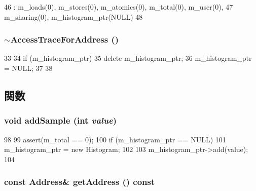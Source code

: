 \begin{DoxyCode}
46         : m_loads(0), m_stores(0), m_atomics(0), m_total(0), m_user(0),
47           m_sharing(0), m_histogram_ptr(NULL)
48     { }
\end{DoxyCode}
\hypertarget{classAccessTraceForAddress_aaa716e2119d8eda1e7428c63cedd2d75}{
\subsubsection[{$\sim$AccessTraceForAddress}]{\setlength{\rightskip}{0pt plus 5cm}$\sim${\bf AccessTraceForAddress} ()}}
\label{classAccessTraceForAddress_aaa716e2119d8eda1e7428c63cedd2d75}



\begin{DoxyCode}
33 {
34     if (m_histogram_ptr) {
35         delete m_histogram_ptr;
36         m_histogram_ptr = NULL;
37     }
38 }
\end{DoxyCode}


\subsection{関数}
\hypertarget{classAccessTraceForAddress_ae8690c0646a12dd970f77127705f1449}{
\subsubsection[{addSample}]{\setlength{\rightskip}{0pt plus 5cm}void addSample (int {\em value})}}
\label{classAccessTraceForAddress_ae8690c0646a12dd970f77127705f1449}



\begin{DoxyCode}
98 {
99     assert(m_total == 0);
100     if (m_histogram_ptr == NULL) {
101         m_histogram_ptr = new Histogram;
102     }
103     m_histogram_ptr->add(value);
104 }
\end{DoxyCode}
\hypertarget{classAccessTraceForAddress_aca15ef966561def0b4db75a6f7e085b6}{
\subsubsection[{getAddress}]{\setlength{\rightskip}{0pt plus 5cm}const {\bf Address}\& getAddress () const}}
\label{classAccessTraceForAddress_aca15ef966561def0b4db75a6f7e085b6}



